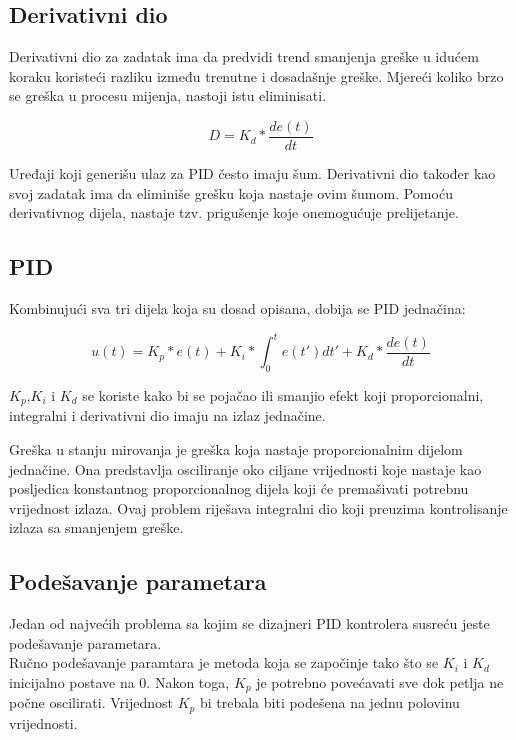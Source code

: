 \documentclass[../Document.tex]{subfiles}
\begin{document}
\subsection{Derivativni dio}
Derivativni dio za zadatak ima da predvidi trend smanjenja greške u idućem koraku koristeći razliku između trenutne i dosadašnje greške. Mjereći koliko brzo se greška u procesu mijenja, nastoji istu eliminisati.

$$
    D=K_d*\frac{de(t)}{dt}
$$

\noindent Uređaji koji generišu ulaz za PID često imaju šum. Derivativni dio također kao svoj zadatak ima da eliminiše grešku koja nastaje ovim šumom. Pomoću derivativnog dijela, nastaje tzv. prigušenje koje onemogućuje prelijetanje.
\clearpage

\subsection{PID}
Kombinujući sva tri dijela koja su dosad opisana, dobija se PID jednačina:

$$
    u(t)=K_p*e(t) + K_i*\int_{0}^{t}e(t')dt' + K_d*\frac{de(t)}{dt}
$$

\noindent $K_p$,$K_i$ i $K_d$ se koriste kako bi se pojačao ili smanjio efekt koji proporcionalni, integralni i derivativni dio imaju na izlaz jednačine.\\


\noindent Greška u stanju mirovanja je greška koja nastaje proporcionalnim dijelom jednačine. Ona predstavlja osciliranje oko ciljane vrijednosti koje nastaje kao posljedica konstantnog proporcionalnog dijela koji će premašivati potrebnu vrijednost izlaza. Ovaj problem riješava integralni dio koji preuzima kontrolisanje izlaza sa smanjenjem greške.


\subsection{Podešavanje parametara} \label{tuning}
Jedan od najvećih problema sa kojim se dizajneri PID kontrolera susreću jeste podešavanje parametara.\\

\noindent Ručno podešavanje paramtara je metoda koja se započinje tako što se $K_i$ i $K_d$ inicijalno postave na 0. Nakon toga, $K_p$ je potrebno povećavati sve dok petlja ne počne oscilirati. Vrijednost $K_p$ bi trebala biti podešena na jednu polovinu vrijednosti.
\end{document}
